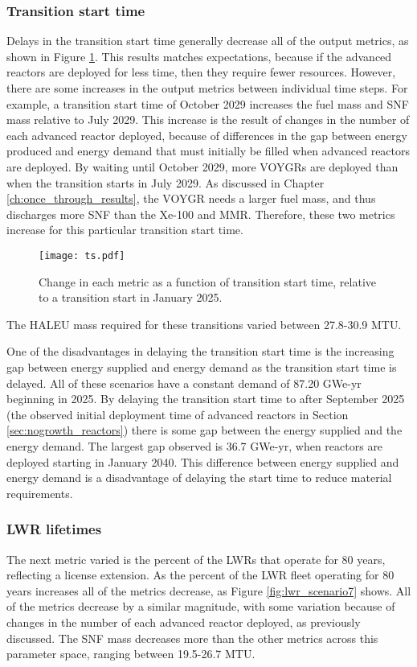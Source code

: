 \subsubsection{Transition start time}
Delays in the transition start time generally decrease all of the output 
metrics, as shown in Figure \ref{fig:ts_scenario7}. This results matches 
expectations, because if the advanced reactors are deployed for less time, 
then they require fewer resources. However, there are some increases in 
the output metrics between individual time steps. For example, a transition 
start time of October 2029 increases the fuel mass and \gls{SNF} mass 
relative to July 2029. This increase is the result of changes in the number 
of each advanced reactor deployed, because of differences in the gap 
between energy produced and energy demand that must initially be filled when 
advanced reactors are deployed. By waiting until October 2029, more VOYGRs 
are deployed than when the transition starts in July 2029. As discussed in 
Chapter \ref{ch:once_through_results}, the VOYGR needs a larger fuel mass, 
and thus discharges more \gls{SNF} than the Xe-100 and \gls{MMR}. Therefore, 
these two metrics increase for this particular transition start time. 

\begin{figure}
    \centering
    \texttt{[image: ts.pdf]}
    \caption{Change in each metric as a function of transition start 
    time, relative to a transition start in January 2025.}
    \label{fig:ts_scenario7}
\end{figure}

The \gls{HALEU} mass required for these transitions varied between 27.8-30.9
MTU. 

One of the disadvantages in delaying the transition start time is the 
increasing gap between energy supplied and energy demand as the transition 
start time is delayed. All of these scenarios have a constant demand 
of 87.20 GWe-yr beginning in 2025. By delaying the transition start time 
to after September 2025 (the observed initial deployment time of advanced 
reactors in Section \ref{sec:nogrowth_reactors}) there is some gap between 
the energy supplied and the energy demand. The largest gap observed is 36.7
GWe-yr, when reactors are deployed starting in January 2040. This difference 
between energy supplied and energy demand is a disadvantage of delaying 
the start time to reduce material requirements. 

\subsubsection{LWR lifetimes}
The next metric varied is the percent of the \glspl{LWR} that operate for 
80 years, reflecting a license extension. As the percent of the \gls{LWR} 
fleet operating for 80 years increases all of the metrics decrease, as 
Figure \ref{fig:lwr_scenario7} shows. All of the metrics decrease by a similar 
magnitude, with some variation because of changes in the number of each advanced 
reactor deployed, as previously discussed. The \gls{SNF} mass decreases more 
than the other metrics across this parameter space, ranging between 
19.5-26.7 MTU.

